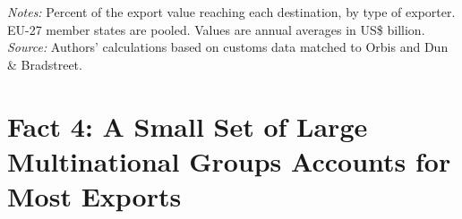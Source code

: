 \documentclass[11pt,a4paper]{article}
\begin{document}
\begin{table}[H]\centering\footnotesize%
  \caption{Other Goods: Ownership of Exports to the Main Destination Markets}%
  \label{tab:dest_rest}%
  \par\vspace{3pt}%
  \begin{minipage}{0.95\textwidth}\footnotesize %
  \textit{Notes:} Percent of the export value reaching each destination, by type of exporter. EU-27 member states are pooled. Values are annual averages in US\$ billion.\\[3pt]%
  \textit{Source:} Authors' calculations based on customs data matched to Orbis and Dun \& Bradstreet.%
  \end{minipage}%
  \end{table}

\section{Fact 4: A Small Set of Large Multinational Groups Accounts for Most Exports}\label{sec:f4s_rest}
\end{document}
